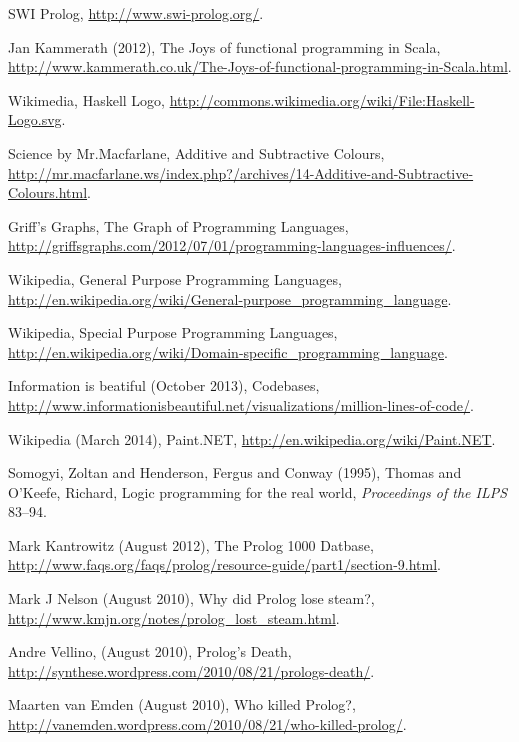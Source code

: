 \documentclass[aspectratio=1610]{beamer}
\begin{document}
\begin{frame} [allowframebreaks]
{\begin{thebibliography}{9}
 SWI Prolog, \url{http://www.swi-prolog.org/}. 

 Jan Kammerath (2012), The Joys of functional programming in Scala,  \url{http://www.kammerath.co.uk/The-Joys-of-functional-programming-in-Scala.html}.

 Wikimedia, Haskell Logo, \url{http://commons.wikimedia.org/wiki/File:Haskell-Logo.svg}.

 Science by Mr.Macfarlane, Additive and Subtractive Colours, \url{http://mr.macfarlane.ws/index.php?/archives/14-Additive-and-Subtractive-Colours.html}.  

 Griff's Graphs, The Graph of Programming Languages, \url{http://griffsgraphs.com/2012/07/01/programming-languages-influences/}.

  Wikipedia, General Purpose Programming Languages, \url{http://en.wikipedia.org/wiki/General-purpose_programming_language}.
 
  Wikipedia, Special Purpose Programming Languages, \url{http://en.wikipedia.org/wiki/Domain-specific_programming_language}.

   Information is beatiful (October 2013), Codebases, \url{http://www.informationisbeautiful.net/visualizations/million-lines-of-code/}.
   
    Wikipedia (March 2014), Paint.NET, \url{http://en.wikipedia.org/wiki/Paint.NET}.
   
    Somogyi, Zoltan and Henderson, Fergus and Conway (1995), Thomas and O’Keefe, Richard, Logic programming for the real world, \textit{Proceedings of the ILPS} 83--94. 
 
     Mark Kantrowitz (August 2012), The Prolog 1000 Datbase, \url{http://www.faqs.org/faqs/prolog/resource-guide/part1/section-9.html}.
    
    Mark J Nelson (August 2010), Why did Prolog lose steam?, \url{http://www.kmjn.org/notes/prolog_lost_steam.html}.  
      
      Andre Vellino, (August 2010), Prolog's Death, \url{http://synthese.wordpress.com/2010/08/21/prologs-death/}.  

      Maarten van Emden (August 2010), Who killed Prolog?, \url{http://vanemden.wordpress.com/2010/08/21/who-killed-prolog/}.      
    

\end{thebibliography}}
\end{frame}
\end{document}

